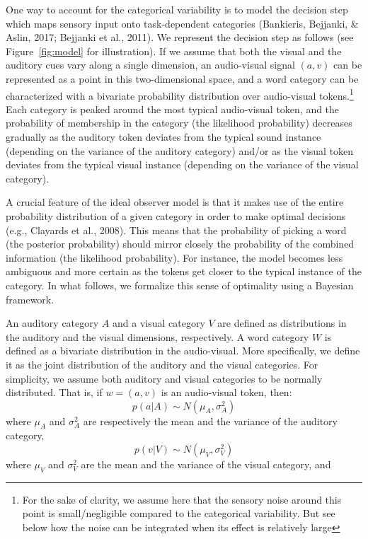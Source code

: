 \documentclass[english,man]{apa6}
\theoremstyle{definition}
\theoremstyle{definition}
\theoremstyle{definition}
\theoremstyle{remark}
\begin{document}
One way to account for the categorical variability is to model the
decision step which maps sensory input onto task-dependent categories
(Bankieris, Bejjanki, \& Aslin, 2017; Bejjanki et al., 2011). We
represent the decision step as follows (see Figure~\ref{fig:model} for
illustration). If we assume that both the visual and the auditory cues
vary along a single dimension, an audio-visual signal \((a,v)\) can be
represented as a point in this two-dimensional space, and a word
category can be characterized with a bivariate probability distribution
over audio-visual
tokens.\footnote{For the sake of clarity, we assume here that the sensory noise around this point is small/negligible compared to the categorical variability. But see below how the noise can be integrated when its effect is relatively large}
Each category is peaked around the most typical audio-visual token, and
the probability of membership in the category (the likelihood
probability) decreases gradually as the auditory token deviates from the
typical sound instance (depending on the variance of the auditory
category) and/or as the visual token deviates from the typical visual
instance (depending on the variance of the visual category).

A crucial feature of the ideal observer model is that it makes use of
the entire probability distribution of a given category in order to make
optimal decisions (e.g., Clayards et al., 2008). This means that the
probability of picking a word (the posterior probability) should mirror
closely the probability of the combined information (the likelihood
probability). For instance, the model becomes less ambiguous and more
certain as the tokens get closer to the typical instance of the
category. In what follows, we formalize this sense of optimality using a
Bayesian framework.

An auditory category \(A\) and a visual category \(V\) are defined as
distributions in the auditory and the visual dimensions, respectively. A
word category \(W\) is defined as a bivariate distribution in the
audio-visual. More specifically, we define it as the joint distribution
of the auditory and the visual categories. For simplicity, we assume
both auditory and visual categories to be normally distributed. That is,
if \(w=(a,v)\) is an audio-visual token, then:
\[ p(a | A) \sim  N(\mu_A, \sigma^2_A) \] where \(\mu_A\) and
\(\sigma^2_A\) are respectively the mean and the variance of the
auditory category, \[ p(v | V) \sim  N(\mu_V, \sigma^2_V) \] where
\(\mu_V\) and \(\sigma^2_V\) are the mean and the variance of the visual
category, and
\end{document}
